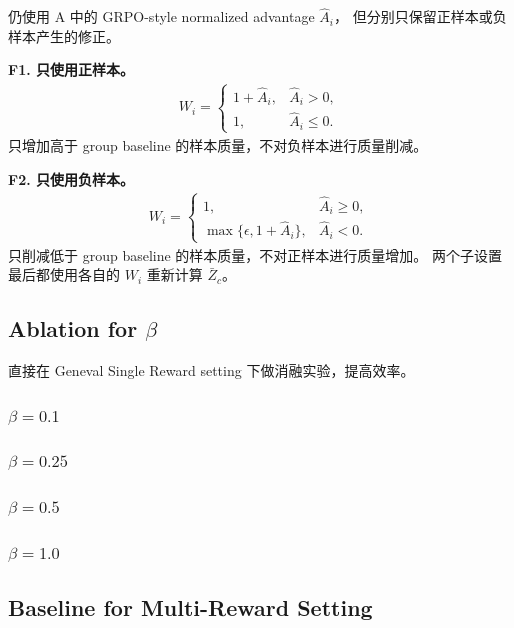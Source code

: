 \documentclass[10pt]{article}
\begin{document}
仍使用 A 中的 GRPO-style normalized advantage $\widehat A_i$，
但分别只保留正样本或负样本产生的修正。

\noindent\textbf{F1. 只使用正样本。}
\begin{align}
W_i
=
\begin{cases}
1+\widehat A_i,
& \widehat A_i>0,\\
1,
& \widehat A_i\le0.
\end{cases}
\end{align}
只增加高于 group baseline 的样本质量，不对负样本进行质量削减。

\medskip
\noindent\textbf{F2. 只使用负样本。}
\begin{align}
W_i
=
\begin{cases}
1,
& \widehat A_i\ge0,\\
\max\{\epsilon,1+\widehat A_i\},
& \widehat A_i<0.
\end{cases}
\end{align}
只削减低于 group baseline 的样本质量，不对正样本进行质量增加。
两个子设置最后都使用各自的 $W_i$ 重新计算 $\bar Z_c$。








\subsection{Ablation for $\beta$}

直接在 Geneval Single Reward setting 下做消融实验，提高效率。


\subsubsection{$\beta = 0.1$}


\subsubsection{$\beta = 0.25$}


\subsubsection{$\beta = 0.5$}


\subsubsection{$\beta = 1.0$}






\subsection{Baseline for Multi-Reward Setting}
\end{document}
